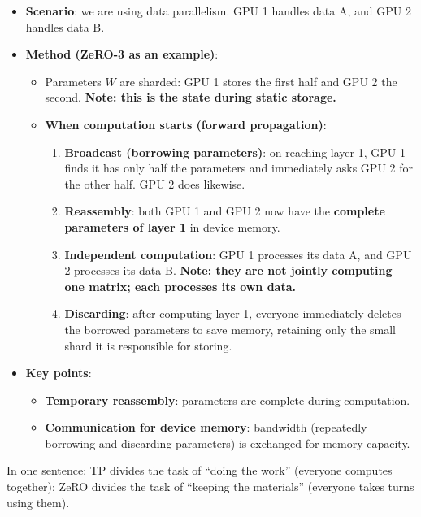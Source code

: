 \begin{itemize}
\tightlist
\item
  \textbf{Scenario}: we are using data parallelism. GPU 1 handles data A, and GPU 2 handles data B.
\item
{}
  \textbf{Method (ZeRO-3 as an example)}:

  \begin{itemize}
  \tightlist
  \item
    Parameters \(W\) are sharded: GPU 1 stores the first half and GPU 2 the second. \textbf{Note: this is the state during static storage.}
  \item
{}
    \textbf{When computation starts (forward propagation)}:

    \begin{enumerate}
    \def\labelenumi{\arabic{enumi}.}
    \tightlist
    \item
      \textbf{Broadcast (borrowing parameters)}: on reaching layer 1, GPU 1 finds it has only half the parameters and immediately asks GPU 2 for the other half. GPU 2 does likewise.
    \item
      \textbf{Reassembly}: both GPU 1 and GPU 2 now have the \textbf{complete parameters of layer 1} in device memory.
    \item
      \textbf{Independent computation}: GPU 1 processes its data A, and GPU 2 processes its data B. \textbf{Note: they are not jointly computing one matrix; each processes its own data.}
    \item
      \textbf{Discarding}: after computing layer 1, everyone immediately deletes the borrowed parameters to save memory, retaining only the small shard it is responsible for storing.
    \end{enumerate}
  \end{itemize}
\item
{}
  \textbf{Key points}:

  \begin{itemize}
  \tightlist
  \item
    \textbf{Temporary reassembly}: parameters are complete during computation.
  \item
    \textbf{Communication for device memory}: bandwidth (repeatedly borrowing and discarding parameters) is exchanged for memory capacity.
  \end{itemize}
\end{itemize}

In one sentence: TP divides the task of ``doing the work'' (everyone computes together); ZeRO divides the task of ``keeping the materials'' (everyone takes turns using them).

